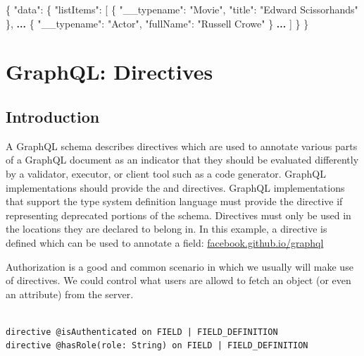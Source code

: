 \documentclass[]{book}
\newenvironment{Shaded}{\begin{snugshade}}{\end{snugshade}}
\newcommand{\DataTypeTok}[1]{\textcolor[rgb]{0.13,0.29,0.53}{#1}}
\newcommand{\StringTok}[1]{\textcolor[rgb]{0.31,0.60,0.02}{#1}}
\newcommand{\OtherTok}[1]{\textcolor[rgb]{0.56,0.35,0.01}{#1}}
\newcommand{\FunctionTok}[1]{\textcolor[rgb]{0.00,0.00,0.00}{#1}}
\newcommand{\ErrorTok}[1]{\textcolor[rgb]{0.64,0.00,0.00}{\textbf{#1}}}
\begin{document}
\begin{Shaded}
\begin{Highlighting}[]
\FunctionTok{\{}
  \DataTypeTok{"data"}\FunctionTok{:} \FunctionTok{\{}
    \DataTypeTok{"listItems"}\FunctionTok{:} \OtherTok{[}
      \FunctionTok{\{}
        \DataTypeTok{"__typename"}\FunctionTok{:} \StringTok{"Movie"}\FunctionTok{,}
        \DataTypeTok{"title"}\FunctionTok{:} \StringTok{"Edward Scissorhands"}
      \FunctionTok{\}}\OtherTok{,}
      \ErrorTok{...}
      \FunctionTok{\{}
        \DataTypeTok{"__typename"}\FunctionTok{:} \StringTok{"Actor"}\FunctionTok{,}
        \DataTypeTok{"fullName"}\FunctionTok{:} \StringTok{"Russell Crowe"}
      \FunctionTok{\}}
      \ErrorTok{...}
    \OtherTok{]}
  \FunctionTok{\}}
\FunctionTok{\}}
\end{Highlighting}
\end{Shaded}

\chapter{GraphQL: Directives}\label{graphql-directives}

\section{Introduction}\label{introduction-4}

A GraphQL schema describes directives which are used to annotate various
parts of a GraphQL document as an indicator that they should be
evaluated differently by a validator, executor, or client tool such as a
code generator. GraphQL implementations should provide the \citet{skip}
and \citet{include} directives. GraphQL implementations that support the
type system definition language must provide the \citet{deprecated}
directive if representing deprecated portions of the schema. Directives
must only be used in the locations they are declared to belong in. In
this example, a directive is defined which can be used to annotate a
field:
\href{https://facebook.github.io/graphql/draft/\#sec-Type-System.Directives}{facebook.github.io/graphql}

Authorization is a good and common scenario in which we usually will
make use of directives. We could control what users are allowd to fetch
an object (or even an attribute) from the server.

\begin{verbatim}

directive @isAuthenticated on FIELD | FIELD_DEFINITION
directive @hasRole(role: String) on FIELD | FIELD_DEFINITION

\end{verbatim}
\end{document}
